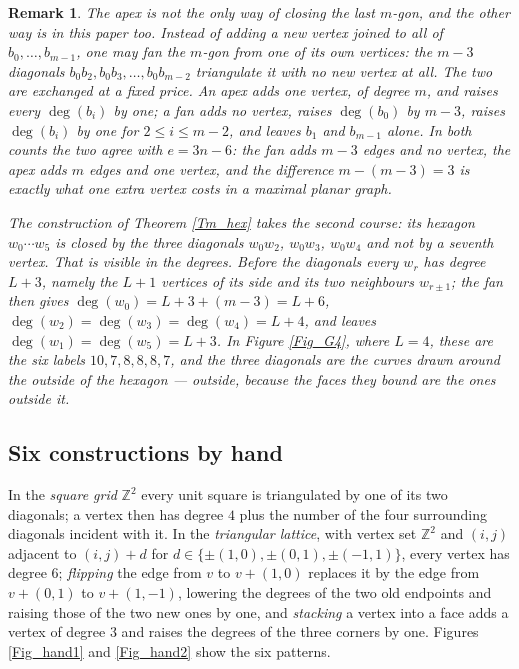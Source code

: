 \documentclass[10pt,a4paper]{article}
\newtheorem{remark}[theorem]{Remark}
\begin{document}
\begin{remark}
\label{Rem_fan}The apex is not the only way of closing the last $m$-gon, and the other way is in this paper
too. Instead of adding a new vertex joined to all of $b_{0},\ldots ,b_{m-1}$, one may \emph{fan} the
$m$-gon from one of its own vertices: the $m-3$ diagonals $b_{0}b_{2},b_{0}b_{3},\ldots ,b_{0}b_{m-2}$
triangulate it with no new vertex at all. The two are exchanged at a fixed price. An apex adds one vertex,
of degree $m$, and raises every $\deg (b_{i})$ by one; a fan adds no vertex, raises $\deg (b_{0})$ by
$m-3$, raises $\deg (b_{i})$ by one for $2\leq i\leq m-2$, and leaves $b_{1}$ and $b_{m-1}$ alone. In both
counts the two agree with $e=3n-6$: the fan adds $m-3$ edges and no vertex, the apex adds $m$ edges and
one vertex, and the difference $m-(m-3)=3$ is exactly what one extra vertex costs in a maximal planar graph.

The construction of Theorem \ref{Tm_hex} takes the second course: its hexagon $w_{0}\cdots w_{5}$ is closed
by the three diagonals $w_{0}w_{2}$, $w_{0}w_{3}$, $w_{0}w_{4}$ and not by a seventh vertex. That is
visible in the degrees. Before the diagonals every $w_{r}$ has degree $L+3$, namely the $L+1$ vertices of
its side and its two neighbours $w_{r\pm 1}$; the fan then gives $\deg (w_{0})=L+3+(m-3)=L+6$,
$\deg (w_{2})=\deg (w_{3})=\deg (w_{4})=L+4$, and leaves $\deg (w_{1})=\deg (w_{5})=L+3$. In Figure
\ref{Fig_G4}, where $L=4$, these are the six labels $10,7,8,8,8,7$, and the three diagonals are the curves
drawn around the outside of the hexagon --- outside, because the faces they bound are the ones outside it.

\end{remark}

\subsection{Six constructions by hand}

In the \emph{square grid} $\mathbb{Z}^{2}$ every unit square is triangulated by one of its two diagonals; a vertex then
has degree $4$ plus the number of the four surrounding diagonals incident with it. In the \emph{triangular lattice},
with vertex set $\mathbb{Z}^{2}$ and $(i,j)$ adjacent to $(i,j)+d$ for $d\in \{\pm (1,0),\pm (0,1),\pm (-1,1)\}$,
every vertex has degree $6$; \emph{flipping} the edge from $v$ to $v+(1,0)$ replaces it by the edge from $v+(0,1)$ to
$v+(1,-1)$, lowering the degrees of the two old endpoints and raising those of the two new ones by one, and
\emph{stacking} a vertex into a face adds a vertex of degree $3$ and raises the degrees of the three corners by one.
Figures \ref{Fig_hand1} and \ref{Fig_hand2} show the six patterns.
\end{document}
